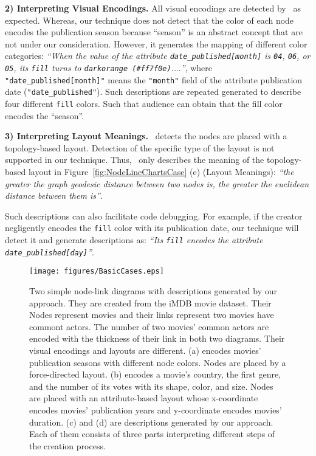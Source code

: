 \textbf{2) Interpreting Visual Encodings.} All visual encodings are detected by \ApproachName~as expected.
Whereas, our technique does not detect that the color of each node encodes the publication season because ``season'' is an abstract concept that are not under our consideration.
However, it generates the mapping of different color categories: 
\textit{``When the value of the attribute {\texttt{date\_published[month]}} is {\texttt{04}}, {\texttt{06}}, or {\texttt{05}}, 
its {\texttt{fill}} turns to {\texttt{darkorange (\#ff7f0e)}}.$\ldots$''}, 
where \texttt{"date\_published[month]"} means the \texttt{"month"} field of the attribute publication date (\texttt{"date\_published"}).
Such descriptions are repeated generated to describe four different \texttt{fill} colors.
Such that audience can obtain that the fill color encodes the ``season''.

\textbf{3) Interpreting Layout Meanings.} \ApproachName~detects the nodes are placed with a topology-based layout. 
Detection of the specific type of the layout is not supported in our technique.
Thus, \ApproachName~only describes the meaning of the topology-based layout in Figure~\ref{fig:NodeLineChartsCase} (e) (Layout Meanings): \textit{``the greater the graph geodesic distance between two nodes is, the greater the euclidean distance between them is''}.

Such descriptions can also facilitate code debugging. 
For example, if the creator negligently encodes the \texttt{fill} color with its publication date,
our technique will detect it and generate descriptions as: \textit{``Its \texttt{fill} encodes the attribute \texttt{date\_published[day]}''}.

\begin{figure*}[ht]
    \centering
    \texttt{[image: figures/BasicCases.eps]}
    \caption{Two simple node-link diagrams with descriptions generated by our approach. 
    They are created from the iMDB movie dataset. 
    Their Nodes represent movies and their links represent two movies have commont actors.
    The number of two movies' common actors are encoded with the thickness of their link in both two diagrams.
    Their visual encodings and layouts are different.
    (a) encodes movies' publication seasons with different node colors. Nodes are placed by a force-directed layout.  (b) encodes a movie's country, the first genre, and the number of its votes with its shape, color, and size. Nodes are placed with an attribute-based layout whose x-coordinate encodes movies' publication years and y-coordinate encodes movies' duration. (c) and (d) are descriptions generated by our approach. Each of them consists of three parts interpreting different steps of the creation process. }
  \label{fig:BasicCases}
\end{figure*}

